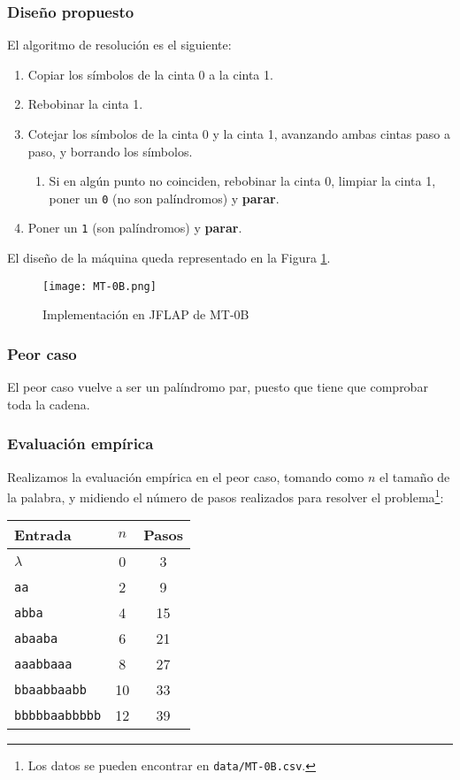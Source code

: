 \subsubsection*{Diseño propuesto}
El algoritmo de resolución es el siguiente:

\begin{enumerate}
    \item Copiar los símbolos de la cinta 0 a la cinta 1.
    \item Rebobinar la cinta 1.
    \item Cotejar los símbolos de la cinta 0 y la cinta 1, avanzando ambas cintas paso a paso, y borrando los símbolos.
    \begin{enumerate}[1.]
        \item Si en algún punto no coinciden, rebobinar la cinta 0, limpiar la cinta 1, poner un \texttt{0} (no son palíndromos) y \textbf{parar}.
    \end{enumerate}
    \item Poner un \texttt{1} (son palíndromos) y \textbf{parar}.
\end{enumerate}

El diseño de la máquina queda representado en la Figura \ref{fig:MT-0B}.

\begin{figure}[h]
    \centering
    \texttt{[image: MT-0B.png]}
    \caption{Implementación en JFLAP de MT-0B}
    \label{fig:MT-0B}
\end{figure}

\subsubsection*{Peor caso}
El peor caso vuelve a ser un palíndromo par, puesto que tiene que comprobar toda la cadena.

\subsubsection*{Evaluación empírica}
Realizamos la evaluación empírica en el peor caso, tomando como $n$ el tamaño de la palabra, y midiendo el número de pasos realizados para resolver el problema\footnote{Los datos se pueden encontrar en \texttt{data/MT-0B.csv}.}:

\begin{table}[h]
    \centering
    \begin{tabular}{lcc}
        Entrada & $n$ & Pasos \\
        \hline
        $\lambda$               & 0  & 3  \\
        \texttt{aa}             & 2  & 9  \\
        \texttt{abba}           & 4  & 15 \\
        \texttt{abaaba}         & 6  & 21 \\
        \texttt{aaabbaaa}       & 8  & 27 \\
        \texttt{bbaabbaabb}     & 10 & 33 \\
        \texttt{bbbbbaabbbbb}   & 12 & 39
    \end{tabular}
\end{table}


